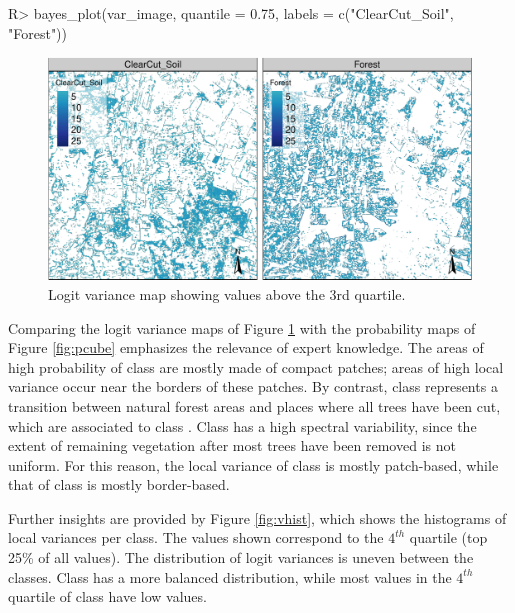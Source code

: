 \documentclass[
  shortnames]{jss}
\begin{document}
\begin{CodeChunk}
\begin{CodeInput}
R> bayes_plot(var_image, quantile = 0.75, labels = c("ClearCut_Soil", "Forest"))
\end{CodeInput}
\begin{figure}[h]

{\centering \includegraphics{Bayesian_smoothing_JSS_files/figure-latex/vcube-1} 

}

\caption[Logit variance map showing values above the 3rd quartile]{Logit variance map showing values above the 3rd quartile.}\label{fig:vcube}
\end{figure}
\end{CodeChunk}

Comparing the logit variance maps of Figure \ref{fig:vcube} with the probability maps of Figure \ref{fig:pcube} emphasizes the relevance of expert knowledge. The areas of high probability of class  are mostly made of compact patches; areas of high local variance occur near the borders of these patches. By contrast, class  represents a transition between natural forest areas and places where all trees have been cut, which are associated to class . Class  has a high spectral variability, since the extent of remaining vegetation after most trees have been removed is not uniform. For this reason, the local variance of class  is mostly patch-based, while that of class  is mostly border-based.

Further insights are provided by Figure \ref{fig:vhist}, which shows the histograms of local variances per class. The values shown correspond to the \(4^{th}\) quartile (top 25\% of all values). The distribution of logit variances is uneven between the classes. Class  has a more balanced distribution, while most values in the \(4^{th}\) quartile of class  have low values.
\end{document}
